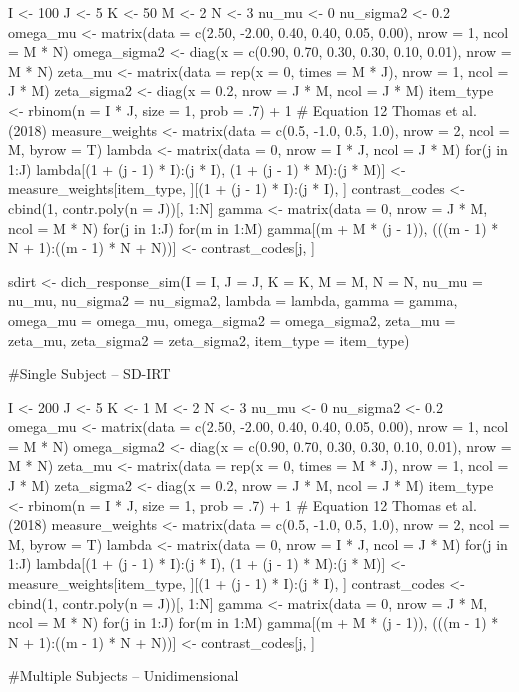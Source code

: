 \documentclass[a4paper]{book}
\begin{document}
\begin{Examples}
\begin{ExampleCode}
I <- 100
J <- 5
K <- 50
M <- 2
N <- 3
nu_mu <- 0
nu_sigma2 <- 0.2
omega_mu <- matrix(data = c(2.50, -2.00, 0.40, 0.40, 0.05, 0.00), nrow = 1,
ncol = M * N)
omega_sigma2 <- diag(x = c(0.90, 0.70, 0.30, 0.30, 0.10, 0.01), nrow = M * N)
zeta_mu <- matrix(data = rep(x = 0, times = M * J), nrow = 1, ncol = J * M)
zeta_sigma2 <- diag(x = 0.2, nrow = J * M, ncol = J * M)
item_type <- rbinom(n = I * J, size = 1, prob = .7) + 1
# Equation 12 Thomas et al. (2018)
measure_weights <-
  matrix(data = c(0.5, -1.0, 0.5, 1.0), nrow = 2, ncol = M, byrow = T)
lambda <- matrix(data = 0, nrow = I * J, ncol = J * M)
for(j in 1:J) {
  lambda[(1 + (j - 1) * I):(j * I), (1 + (j - 1) * M):(j * M)] <-
    measure_weights[item_type, ][(1 + (j - 1) * I):(j * I), ]
}
contrast_codes <- cbind(1, contr.poly(n = J))[, 1:N]
gamma <- matrix(data = 0, nrow = J * M, ncol = M * N)
for(j in 1:J) {
  for(m in 1:M) {
    gamma[(m + M * (j - 1)), (((m - 1) * N + 1):((m - 1) * N + N))] <-
    contrast_codes[j, ]
  }
}

sdirt <- dich_response_sim(I = I, J = J, K = K, M = M, N = N, nu_mu = nu_mu,
                           nu_sigma2 = nu_sigma2, lambda = lambda,
                           gamma = gamma, omega_mu = omega_mu,
                           omega_sigma2 = omega_sigma2, zeta_mu = zeta_mu,
                           zeta_sigma2 = zeta_sigma2, item_type = item_type)

#Single Subject -- SD-IRT

I <- 200
J <- 5
K <- 1
M <- 2
N <- 3
nu_mu <- 0
nu_sigma2 <- 0.2
omega_mu <- matrix(data = c(2.50, -2.00, 0.40, 0.40, 0.05, 0.00), nrow = 1,
ncol = M * N)
omega_sigma2 <- diag(x = c(0.90, 0.70, 0.30, 0.30, 0.10, 0.01), nrow = M * N)
zeta_mu <- matrix(data = rep(x = 0, times = M * J), nrow = 1, ncol = J * M)
zeta_sigma2 <- diag(x = 0.2, nrow = J * M, ncol = J * M)
item_type <- rbinom(n = I * J, size = 1, prob = .7) + 1
# Equation 12 Thomas et al. (2018)
measure_weights <-
  matrix(data = c(0.5, -1.0, 0.5, 1.0), nrow = 2, ncol = M, byrow = T)
lambda <- matrix(data = 0, nrow = I * J, ncol = J * M)
for(j in 1:J) {
  lambda[(1 + (j - 1) * I):(j * I), (1 + (j - 1) * M):(j * M)] <-
    measure_weights[item_type, ][(1 + (j - 1) * I):(j * I), ]
}
contrast_codes <- cbind(1, contr.poly(n = J))[, 1:N]
gamma <- matrix(data = 0, nrow = J * M, ncol = M * N)
for(j in 1:J) {
  for(m in 1:M) {
    gamma[(m + M * (j - 1)), (((m - 1) * N + 1):((m - 1) * N + N))] <-
    contrast_codes[j, ]
  }
}

#Multiple Subjects -- Unidimensional


\end{ExampleCode}
\end{Examples}
\end{document}
